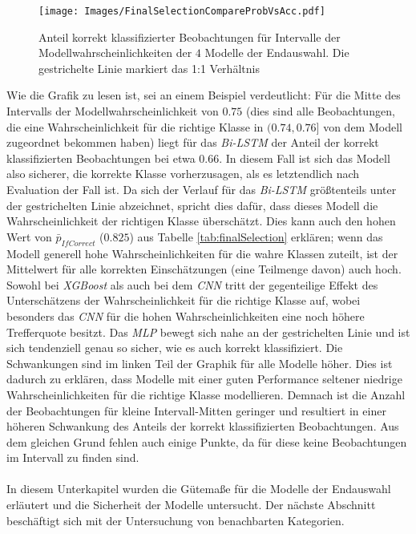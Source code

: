 \documentclass[a4paper,11pt]{article}
\begin{document}
\begin{figure}[ht]
    \centering
\texttt{[image: Images/FinalSelectionCompareProbVsAcc.pdf]} 
\caption{Anteil korrekt klassifizierter Beobachtungen für Intervalle der Modellwahrscheinlichkeiten der $4$ Modelle der Endauswahl. Die gestrichelte Linie markiert das 1:1 Verhältnis}
\label{abb:CompareProbVsAcc}
\end{figure}

Wie die Grafik zu lesen ist, sei an einem Beispiel verdeutlicht: Für die Mitte des Intervalls der Modellwahrscheinlichkeit von $0.75$ (dies sind alle Beobachtungen, die eine Wahrscheinlichkeit für die richtige Klasse in $(0.74,0.76]$ von dem Modell zugeordnet bekommen haben) liegt für das \textit{Bi-LSTM} der Anteil der korrekt klassifizierten Beobachtungen bei etwa $0.66$. In diesem Fall ist sich das Modell also sicherer, die korrekte Klasse vorherzusagen, als es letztendlich nach Evaluation der Fall ist. 
Da sich der Verlauf für das \textit{Bi-LSTM} größtenteils unter der gestrichelten Linie abzeichnet, spricht dies dafür, dass dieses Modell die Wahrscheinlichkeit der richtigen Klasse überschätzt. Dies kann auch den hohen Wert von $\bar{p}_{IfCorrect}$ ($0.825$) aus Tabelle \ref{tab:finalSelection} erklären; wenn das Modell generell hohe Wahrscheinlichkeiten für die wahre Klassen zuteilt, ist der Mittelwert für alle korrekten Einschätzungen (eine Teilmenge davon) auch hoch. Sowohl bei \textit{XGBoost} als auch bei dem \textit{CNN} tritt der gegenteilige Effekt des Unterschätzens der Wahrscheinlichkeit für die richtige Klasse auf, wobei besonders das \textit{CNN} für die hohen Wahrscheinlichkeiten eine noch höhere Trefferquote besitzt. Das \textit{MLP} bewegt sich nahe an der gestrichelten Linie und ist sich tendenziell genau so sicher, wie es auch korrekt klassifiziert. Die Schwankungen sind im linken Teil der Graphik für alle Modelle höher. Dies ist dadurch zu erklären, dass Modelle mit einer guten Performance seltener niedrige Wahrscheinlichkeiten für die richtige Klasse modellieren. Demnach ist die Anzahl der Beobachtungen für kleine Intervall-Mitten geringer und resultiert in einer höheren Schwankung des Anteils der korrekt klassifizierten Beobachtungen. Aus dem gleichen Grund fehlen auch einige Punkte, da für diese keine Beobachtungen im Intervall zu finden sind. \\
\\
In diesem Unterkapitel wurden die Gütemaße für die Modelle der Endauswahl erläutert und die Sicherheit der Modelle untersucht. Der nächste Abschnitt beschäftigt sich mit der Untersuchung von benachbarten Kategorien.
\end{document}
